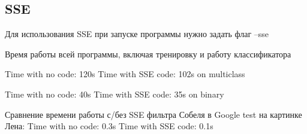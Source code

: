 \subsection*{S\-S\-E }

Для использования S\-S\-E при запуске программы нужно задать флаг --sse

Время работы всей программы, включая тренировку и работу классификатора

Time with no code\-: 120s Time with S\-S\-E code\-: 102s on multiclass

Time with no code\-: 40s Time with S\-S\-E code\-: 35s on binary

Сравнение времени работы с/без S\-S\-E фильтра Собеля в Google test на картинке Лена\-: Time with no code\-: 0.\-3s Time with S\-S\-E code\-: 0.\-1s 
